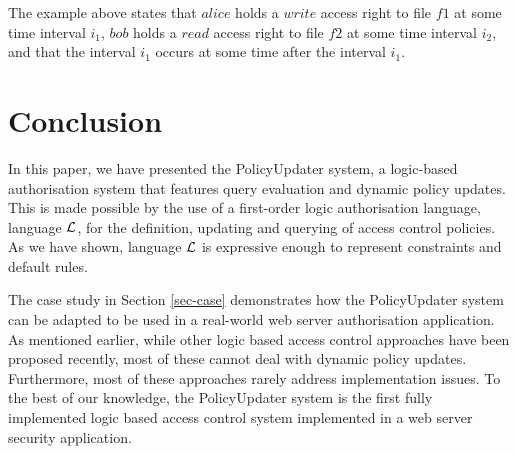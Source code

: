 \documentclass[global,twocolumn,final]{svjour}
\begin{document}
    The example above states that $alice$ holds a $write$ access right to file
    $f1$ at some time interval $i_{1}$, $bob$ holds a $read$ access right to
    file $f2$ at some time interval $i_{2}$, and that the interval $i_{1}$
    occurs at some time after the interval $i_{1}$.

  \section{Conclusion}
    \label{sec-conclusion}

    In this paper, we have presented the PolicyUpdater system, a logic-based
    authorisation system that features query evaluation and dynamic policy
    updates. This is made possible by the use of a first-order logic
    authorisation language, language ${\cal L}$, for the definition, updating
    and querying of access control policies. As we have shown, language
    ${\cal L}$ is expressive enough to represent constraints and default rules.

    The case study in Section \ref{sec-case} demonstrates how the PolicyUpdater
    system can be adapted to be used in a real-world web server authorisation
    application. As mentioned earlier, while other logic based access control
    approaches have been proposed recently, most of these cannot deal with
    dynamic policy updates. Furthermore, most of these approaches rarely
    address implementation issues. To the best of our knowledge, the
    PolicyUpdater system is the first fully implemented logic based access
    control system implemented in a web server security application.
\end{document}
